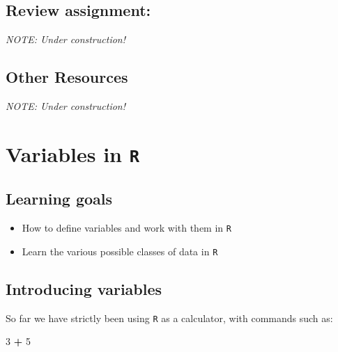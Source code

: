 \documentclass[
]{book}
\newenvironment{Shaded}{\begin{snugshade}}{\end{snugshade}}
\newcommand{\DecValTok}[1]{\textcolor[rgb]{0.00,0.00,0.81}{#1}}
\newcommand{\OperatorTok}[1]{\textcolor[rgb]{0.81,0.36,0.00}{\textbf{#1}}}
\newcommand{\StringTok}[1]{\textcolor[rgb]{0.31,0.60,0.02}{#1}}
\providecommand{\tightlist}{%
  \setlength{\itemsep}{0pt}\setlength{\parskip}{0pt}}
\begin{document}
\hypertarget{review-assignment-1}{%
\section*{Review assignment:}\label{review-assignment-1}}

\emph{NOTE: Under construction!}

\hypertarget{other-resources-1}{%
\section*{Other Resources}\label{other-resources-1}}

\emph{NOTE: Under construction!}

\hypertarget{variables-in-r}{%
\chapter{\texorpdfstring{Variables in \texttt{R}}{Variables in R}}\label{variables-in-r}}

\hypertarget{learning-goals-2}{%
\section*{Learning goals}\label{learning-goals-2}}

\begin{itemize}
\tightlist
\item
  How to define variables and work with them in \texttt{R}\\
\item
  Learn the various possible classes of data in \texttt{R}
\end{itemize}

\hypertarget{introducing-variables}{%
\section*{Introducing variables}\label{introducing-variables}}

So far we have strictly been using \texttt{R} as a calculator, with commands such as:

\begin{Shaded}
\begin{Highlighting}[]
\DecValTok{3} \OperatorTok{+}\StringTok{ }\DecValTok{5}
\end{Highlighting}
\end{Shaded}
\end{document}
